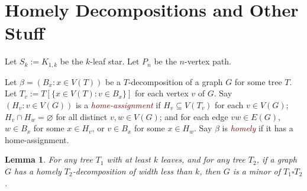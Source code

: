 \documentclass[kpfonts,lotsofwhite]{patmorin}
\newcommand{\defn}[1]{\textcolor{Maroon}{\emph{#1}}}
\renewcommand{\emptyset}{\varnothing}
\theoremstyle{plain}
\newtheorem{lem}[thm]{Lemma}
\theoremstyle{definition}
\begin{document}
{\fontsize{10pt}{11pt}\selectfont

}


\appendix

\section{Homely Decompositions and Other Stuff}

Let $S_k:= K_{1,k}$ be the $k$-leaf star.
Let $P_n$ be the $n$-vertex path.


Let $\beta=(B_x:x\in V(T))$ be a $T$-decomposition
of a graph $G$ for some tree $T$. Let  $T_v:=T[\{x\in V(T):v\in B_x\}]$ for each vertex $v$ of $G$. Say $(H_v:v\in V(G))$ is a \defn{home-assignment} if
$H_v\subseteq V(T_v)$ for each $v\in V(G)$;
$H_v\cap H_w=\emptyset$ for all distinct $v,w\in V(G)$; and for each edge $vw\in E(G)$, $w\in B_x$ for some $x\in H_v$, or $v\in B_x$ for some $x\in H_w$. Say $\beta$ is \defn{homely} if it has a home-assignment.

\begin{lem}
\label{Homely}
For any tree $T_1$ with at least $k$ leaves, and for any tree $T_2$, if a graph $G$ has a homely $T_2$-decomposition of width less than $k$, then $G$ is a minor of $T_1 \square T_2$.
\end{lem}
\end{document}
